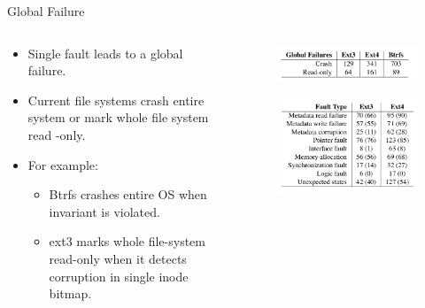 \documentclass[aspectratio=169]{beamer}
\newcommand{\bi}{\begin{itemize}}
\newcommand{\ei}{\end{itemize}}
\begin{document}
\begin{frame}{Global Failure}
    \begin{columns}[T]
        \begin{column}{0.5\textwidth}
        \bi
    \item Single fault leads to a global failure.
    \item Current file systems crash entire system or mark whole file system read
        -only.
    \item For example:
        \bi
    \item Btrfs crashes entire OS when invariant is violated.
    \item ext3 marks whole file-system read-only when it detects corruption in
        single inode bitmap.
        \ei
        \ei
\end{column}
\hspace{-2cm}\begin{column}{0.2\textwidth}
    \pause
    \begin{figure}\flushleft
        \includegraphics[scale=0.3]{./figures/table1.png}
    \end{figure}
    \pause
    \begin{figure}\flushleft
        \includegraphics[scale=0.3]{./figures/table2.png}
    \end{figure}
\end{column}
\end{columns}
\end{frame}
\end{document}

